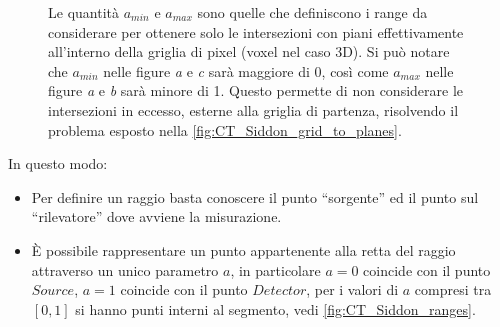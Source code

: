 \documentclass[12pt,a4paper]{report}
\newcounter{figcounter} %
\begin{document}
\begin{figure}[H]
{
  }
  \caption{\label{fig:CT_Siddon_ranges} Le quantità \(a_{min}\) e \(a_{max}\) sono quelle che definiscono i range da considerare
           per ottenere solo le intersezioni con piani effettivamente all'interno della griglia di pixel (voxel nel caso 3D).
           Si può notare che \(a_{min}\) nelle figure \textit{a} e \textit{c} sarà maggiore di 0, così come \(a_{max}\) nelle
           figure \textit{a} e \textit{b} sarà minore di 1.
           Questo permette di non considerare le intersezioni in eccesso, esterne alla griglia di partenza, risolvendo il
           problema esposto nella \autoref{fig:CT_Siddon_grid_to_planes}.}
\end{figure}

In questo modo:
\begin{itemize}
  \item Per definire un raggio basta conoscere il punto ``sorgente'' ed il punto sul ``rilevatore'' dove avviene la misurazione.
  \item È possibile rappresentare un punto appartenente alla retta del raggio attraverso un unico parametro \(a\), in particolare
        \(a = 0\) coincide con il punto \(Source\), \(a = 1\) coincide con il punto \(Detector\), per i valori di \(a\) compresi
        tra \([0, 1]\) si hanno punti interni al segmento, vedi \autoref{fig:CT_Siddon_ranges}.
\end{itemize}
\end{document}
